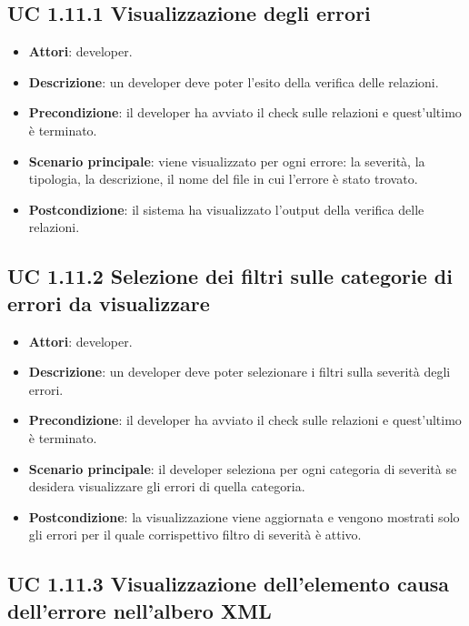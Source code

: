 	\subsection{UC 1.11.1 Visualizzazione degli errori}
		\label{subsec:XEUC1.11.1}
		
		\begin{itemize}
			\item\textbf{Attori}: developer.
			\item\textbf{Descrizione}: un developer deve poter l'esito della verifica delle relazioni.
			\item\textbf{Precondizione}: il developer ha avviato il check sulle relazioni e quest'ultimo è terminato.
			\item\textbf{Scenario principale}: viene visualizzato per ogni errore: la severità, la tipologia, la descrizione, il nome del file in cui l'errore è stato trovato.
			\item\textbf{Postcondizione}: il sistema ha visualizzato l'output della verifica delle relazioni.
		\end{itemize}
		
	\subsection{UC 1.11.2 Selezione dei filtri sulle categorie di errori da visualizzare}
		\label{subsec:XEUC1.11.2}
		
		\begin{itemize}
			\item\textbf{Attori}: developer.
			\item\textbf{Descrizione}: un developer deve poter selezionare i filtri sulla severità degli errori.
			\item\textbf{Precondizione}: il developer ha avviato il check sulle relazioni e quest'ultimo è terminato.
			\item\textbf{Scenario principale}: il developer seleziona per ogni categoria di severità se desidera visualizzare gli errori di quella categoria.
			\item\textbf{Postcondizione}: la visualizzazione viene aggiornata e vengono mostrati solo gli errori per il quale corrispettivo filtro di severità è attivo.
		\end{itemize}
		
	\subsection{UC 1.11.3 Visualizzazione dell'elemento causa dell'errore nell'albero XML}
		\label{subsec:XEUC1.11.3}
		
